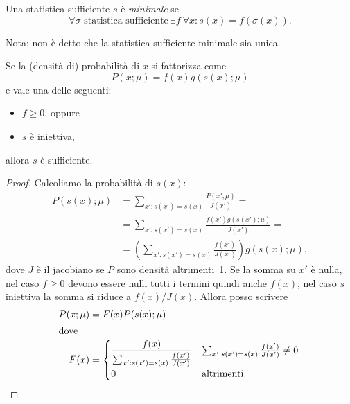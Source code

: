 \begin{definition}
	Una statistica sufficiente $s$ è \emph{minimale} se
	\begin{equation*}
		\forall \sigma \text{ statistica sufficiente}\ \exists f\ \forall x:
		s(x) = f(\sigma(x)).
	\end{equation*}
\end{definition}
Nota: non è detto che la statistica sufficiente minimale sia unica.

\begin{theorem}
	\label{th:suffatt}
	Se la (densità di) probabilità di $x$ si fattorizza come
	\begin{equation*}
		P(x;\mu) = f(x) g(s(x);\mu)
	\end{equation*}
	e vale una delle seguenti:
	\begin{itemize}
		\item $f \ge 0$, oppure
		\item $s$ è iniettiva,
	\end{itemize}
	allora $s$ è sufficiente.
\end{theorem}

\begin{proof}
	Calcoliamo la probabilità di $s(x)$:
	\begin{align*}
		P(s(x);\mu)
		&= \sum_{x':s(x')=s(x)} \frac{P(x';\mu)}{J(x')} = \\
		&= \sum_{x':s(x')=s(x)} \frac{f(x') g(s(x');\mu)}{J(x')} = \\
		&= \left( \sum_{x':s(x')=s(x)} \frac{f(x')}{J(x')} \right) g(s(x);\mu),
	\end{align*}
	dove $J$ è il jacobiano se $P$ sono densità altrimenti~1.
	Se la somma su $x'$ è nulla,
	nel caso $f\ge 0$ devono essere nulli tutti i termini quindi anche $f(x)$,
	nel caso $s$ iniettiva la somma si riduce a $f(x)/J(x)$.
	Allora posso scrivere
	\begin{align*}
		P(x;\mu)
		&= F(x) P(s(x);\mu) \\
		\intertext{dove}
		F(x)
		&= \begin{cases}
			\displaystyle\frac{f(x)}{\sum_{x':s(x')=s(x)} \frac{f(x')}{J(x')}} & \sum_{x':s(x')=s(x)} \frac{f(x')}{J(x')} \neq 0 \\
			0 & \text{altrimenti.}
		\end{cases} \qedhere
	\end{align*}
\end{proof}

